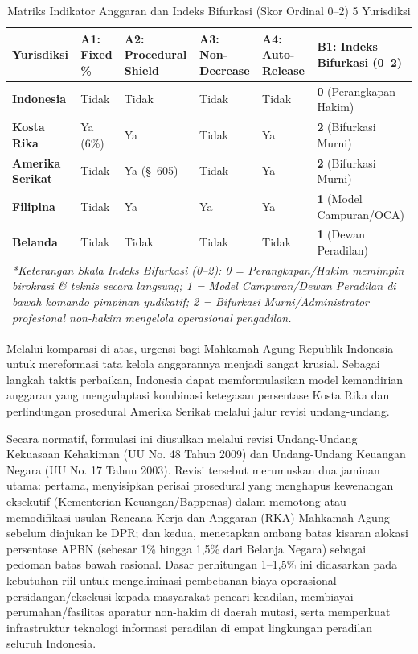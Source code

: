 \documentclass[12pt, a4paper]{article}
\begin{document}
\begin{table}[H]
\centering
\fontsize{9}{11}\selectfont
\caption{Matriks Indikator Anggaran dan Indeks Bifurkasi (Skor Ordinal 0--2) 5 Yurisdiksi}
\label{tab:matriks-indikator-bifurkasi}
\renewcommand{\arraystretch}{1.3}
\begin{tabular}{p{2.5cm} p{1.6cm} p{1.6cm} p{1.6cm} p{1.6cm} p{2.5cm}}
\hline
\textbf{Yurisdiksi} & \textbf{A1: Fixed \%} & \textbf{A2: Procedural Shield} & \textbf{A3: Non-Decrease} & \textbf{A4: Auto-Release} & \textbf{B1: Indeks Bifurkasi (0--2)} \\
\hline
\raggedright\textbf{Indonesia} & Tidak & Tidak & Tidak & Tidak & \textbf{0} (Perangkapan Hakim) \\
\raggedright\textbf{Kosta Rika} & Ya (6\%) & Ya & Tidak & Ya & \textbf{2} (Bifurkasi Murni) \\
\raggedright\textbf{Amerika Serikat} & Tidak & Ya (\S~605) & Tidak & Ya & \textbf{2} (Bifurkasi Murni) \\
\raggedright\textbf{Filipina} & Tidak & Ya & Ya & Ya & \textbf{1} (Model Campuran/OCA) \\
\raggedright\textbf{Belanda} & Tidak & Tidak & Tidak & Tidak & \textbf{1} (Dewan Peradilan) \\
\hline
\multicolumn{6}{p{14cm}}{\textit{*Keterangan Skala Indeks Bifurkasi (0--2): 0 = Perangkapan/Hakim memimpin birokrasi \& teknis secara langsung; 1 = Model Campuran/Dewan Peradilan di bawah komando pimpinan yudikatif; 2 = Bifurkasi Murni/Administrator profesional non-hakim mengelola operasional pengadilan.}} \\
\hline
\end{tabular}
\end{table}

Melalui komparasi di atas, urgensi bagi Mahkamah Agung Republik Indonesia untuk mereformasi tata kelola anggarannya menjadi sangat krusial. Sebagai langkah taktis perbaikan, Indonesia dapat memformulasikan model kemandirian anggaran yang mengadaptasi kombinasi ketegasan persentase Kosta Rika dan perlindungan prosedural Amerika Serikat melalui jalur revisi undang-undang. 

Secara normatif, formulasi ini diusulkan melalui revisi Undang-Undang Kekuasaan Kehakiman (UU No. 48 Tahun 2009) dan Undang-Undang Keuangan Negara (UU No. 17 Tahun 2003). Revisi tersebut merumuskan dua jaminan utama: pertama, menyisipkan perisai prosedural yang menghapus kewenangan eksekutif (Kementerian Keuangan/Bappenas) dalam memotong atau memodifikasi usulan Rencana Kerja dan Anggaran (RKA) Mahkamah Agung sebelum diajukan ke DPR; dan kedua, menetapkan ambang batas kisaran alokasi persentase APBN (sebesar 1\% hingga 1,5\% dari Belanja Negara) sebagai pedoman batas bawah rasional. Dasar perhitungan 1--1,5\% ini didasarkan pada kebutuhan riil untuk mengeliminasi pembebanan biaya operasional persidangan/eksekusi kepada masyarakat pencari keadilan, membiayai perumahan/fasilitas aparatur non-hakim di daerah mutasi, serta memperkuat infrastruktur teknologi informasi peradilan di empat lingkungan peradilan seluruh Indonesia.
\end{document}
